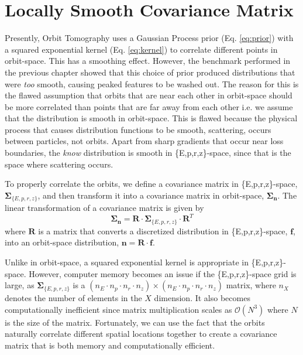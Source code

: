 \section{Locally Smooth Covariance Matrix}
Presently, Orbit Tomography uses a Gaussian Process prior (Eq. \ref{eq:prior}) with a squared exponential kernel (Eq. \ref{eq:kernel}) to correlate different points in orbit-space. This has a smoothing effect. However, the benchmark performed in the previous chapter showed that this choice of prior produced distributions that were \emph{too} smooth, causing peaked features to be washed out. The reason for this is the flawed assumption that orbits that are near each other in orbit-space should be more correlated than points that are far away from each other i.e. we assume that the distribution is smooth in orbit-space. This is flawed because the physical process that causes distribution functions to be smooth, scattering, occurs between particles, not orbits. Apart from sharp gradients that occur near loss boundaries, the \emph{know} distribution is smooth in \{E,p,r,z\}-space, since that is the space where scattering occurs. 

To properly correlate the orbits, we define a covariance matrix in \{E,p,r,z\}-space, $\mathbf{\Sigma}_{\{E,p,r,z\}}$, and then transform it into a covariance matrix in orbit-space, $\mathbf{\Sigma_n}$.
The linear transformation of a covariance matrix is given by
\begin{equation}\label{eq:transform_covariance}
    \mathbf{\Sigma_n} = \mathbf{R} \cdot \mathbf{\Sigma}_{\{E,p,r,z\}} \cdot \mathbf{R}^T
\end{equation}
where $\mathbf{R}$ is a matrix that converts a discretized distribution in \{E,p,r,z\}-space, $\mathbf{f}$, into an orbit-space distribution, $\mathbf{n} = \mathbf{R} \cdot \mathbf{f}$.

Unlike in orbit-space, a squared exponential kernel is appropriate in \{E,p,r,z\}-space. However, computer memory becomes an issue if the \{E,p,r,z\}-space grid is large, as $\mathbf{\Sigma}_{\{E,p,r,z\}}$ is a $(n_E \cdot n_p \cdot n_r \cdot n_z) \times (n_E \cdot n_p \cdot n_r \cdot n_z)$ matrix, where $n_X$ denotes the number of elements in the $X$ dimension. It also becomes computationally inefficient since matrix multiplication scales as $\mathcal{O}(N^3)$ where $N$ is the size of the matrix. 
Fortunately, we can use the fact that the orbits naturally correlate different spatial locations together to create a covariance matrix that is both memory and computationally efficient.

